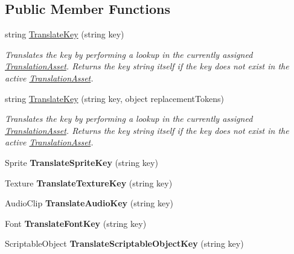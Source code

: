 \subsection*{Public Member Functions}
\begin{DoxyCompactItemize}
\item 
string \hyperlink{class_translator_a603e98880e2c1786727dfca7f00bab18}{Translate\+Key} (string key)
\begin{DoxyCompactList}\small\item\em Translates the key by performing a lookup in the currently assigned \hyperlink{class_translation_asset}{Translation\+Asset}. Returns the key string itself if the key does not exist in the active \hyperlink{class_translation_asset}{Translation\+Asset}. \end{DoxyCompactList}\item 
string \hyperlink{class_translator_aed1e626ef3e062f37de2bc381c413dab}{Translate\+Key} (string key, object replacement\+Tokens)
\begin{DoxyCompactList}\small\item\em Translates the key by performing a lookup in the currently assigned \hyperlink{class_translation_asset}{Translation\+Asset}. Returns the key string itself if the key does not exist in the active \hyperlink{class_translation_asset}{Translation\+Asset}. \end{DoxyCompactList}\item 
Sprite {\bfseries Translate\+Sprite\+Key} (string key)\hypertarget{class_translator_ad94aae4c27a852e83a8212af029533d5}{}\label{class_translator_ad94aae4c27a852e83a8212af029533d5}

\item 
Texture {\bfseries Translate\+Texture\+Key} (string key)\hypertarget{class_translator_aba4cab6c1827643a5982105201b5f6be}{}\label{class_translator_aba4cab6c1827643a5982105201b5f6be}

\item 
Audio\+Clip {\bfseries Translate\+Audio\+Key} (string key)\hypertarget{class_translator_a9e627721b70ae9f6b07ca881da4c14d5}{}\label{class_translator_a9e627721b70ae9f6b07ca881da4c14d5}

\item 
Font {\bfseries Translate\+Font\+Key} (string key)\hypertarget{class_translator_ab7025e58ffc006a392d228a7d2e10cb8}{}\label{class_translator_ab7025e58ffc006a392d228a7d2e10cb8}

\item 
Scriptable\+Object {\bfseries Translate\+Scriptable\+Object\+Key} (string key)\hypertarget{class_translator_a837b8f143c94cdbd6071bb15515c44b2}{}\label{class_translator_a837b8f143c94cdbd6071bb15515c44b2}


\end{DoxyCompactItemize}
